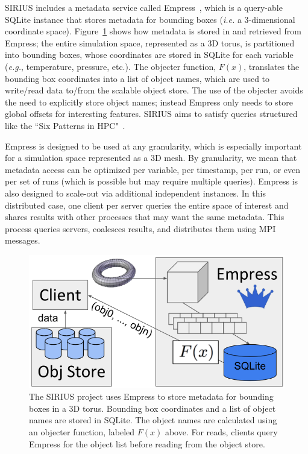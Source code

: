 SIRIUS includes a metadata service called Empress~\cite{lawson:pdsw17-empress},
which is a query-able SQLite instance that stores metadata for bounding boxes
({\it i.e.} a 3-dimensional coordinate space).  Figure~\ref{fig:empress} shows
how metadata is stored in and retrieved from Empress; the entire simulation
space, represented as a 3D torus, is partitioned into bounding boxes, whose
coordinates are stored in SQLite for each variable ({\it e.g.}, temperature,
pressure, etc.).  The objecter function, \(F(x)\), translates the bounding box
coordinates into a list of object names, which are used to write/read data
to/from the scalable object store. The use of the objecter avoids the need to
explicitly store object names; instead Empress only needs to store global
offsets for interesting features. SIRIUS aims to satisfy queries structured
like the ``Six Patterns in HPC"~\cite{lofstead:hpdc11-6degrees}. 

Empress is designed to be used at any granularity, which is especially
important for a simulation space represented as a 3D mesh. By granularity, we
mean that metadata access can be optimized per variable, per timestamp, per
run, or even per set of runs (which is possible but may require multiple
queries).  Empress is also designed to scale-out via additional independent
instances. In this distributed case, one client per server queries the entire
space of interest and shares results with other processes that may want the
same metadata. This process queries servers, coalesces results, and distributes
them using MPI messages.


\begin{figure}[tb]
\centering
  \includegraphics[width=1\linewidth]{figures/empress.png}
  \caption{The SIRIUS project uses Empress to store metadata for bounding boxes
in a 3D torus. Bounding box coordinates and a list of object names are stored
in SQLite. The object names are calculated using an objecter function, labeled
\(F(x)\) above. For reads, clients query Empress for the object list before
reading from the object store.}
  \label{fig:empress}
\end{figure}

